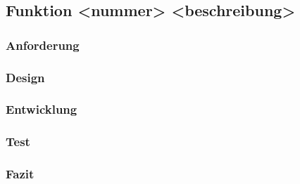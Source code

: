 \subsection{Funktion <nummer> <beschreibung>}

\subsubsection{Anforderung}

\subsubsection{Design}

\subsubsection{Entwicklung}

\subsubsection{Test}

\subsubsection{Fazit}